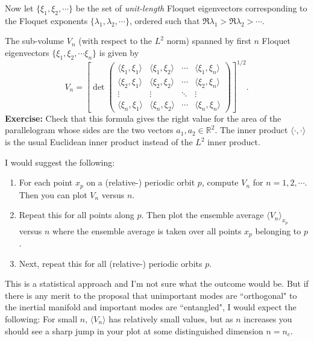 \begin{description}
{Now let $\{\xi_1,\xi_2,\cdots\}$ be the set of \emph{unit-length} Floquet eigenvectors corresponding to the Floquet exponents $\{\lambda_1,\lambda_2,\cdots \}$, ordered such that $\Re\lambda_1>\Re \lambda_2>\cdots$.

The sub-volume $V_n$ (with respect to the $L^2$ norm) spanned by first $n$ Floquet eigenvectors $\{\xi_1,\xi_2,\cdots\xi_n\}$ is given by
\begin{equation}
V_n  = \left[\det\begin{pmatrix}
\langle \xi_1, \xi_1\rangle & \langle \xi_1, \xi_2\rangle & \cdots & \langle \xi_1, \xi_n\rangle\\
\langle \xi_2, \xi_1\rangle & \langle \xi_2, \xi_2\rangle & \cdots & \langle \xi_2, \xi_n\rangle\\
\vdots  & \vdots  & \ddots & \vdots  \\
\langle \xi_n, \xi_1\rangle & \langle \xi_n, \xi_2\rangle & \cdots & \langle \xi_n, \xi_n\rangle
\end{pmatrix}\right]^{1/2}.
\end{equation}
\textbf{Exercise:} Check that this formula gives the right value for the area of the parallelogram whose sides are the two vectors $a_1,a_2\in\mathbb R^2$. The inner product $\langle\cdot,\cdot\rangle$ is the usual Euclidean inner product instead of the $L^2$ inner product.

I would suggest the following:
\begin{enumerate}
	\item For each point $x_p$ on a (relative-) periodic orbit $p$, compute $V_n$ for $n=1,2,\cdots$. Then you can plot $V_n$ versus $n$.
	\item Repeat this for all points along $p$. Then plot the ensemble average $\langle V_n\rangle_{x_p}$ versus $n$ where the ensemble average is taken over all points $x_p$ belonging to $p$.
	\item Next, repeat this for all (relative-) periodic orbits $p$.
\end{enumerate}

This is a statistical approach and I'm not sure what the outcome would be. But if there is any merit to the proposal that unimportant modes are ``orthogonal" to the inertial manifold and important modes are ``entangled", I would expect the following: For small $n$, $\langle V_n\rangle$ has relatively small values, but as $n$ increases you should see a sharp jump in your plot at some distinguished dimension $n=n_c$.
}


\end{description}
